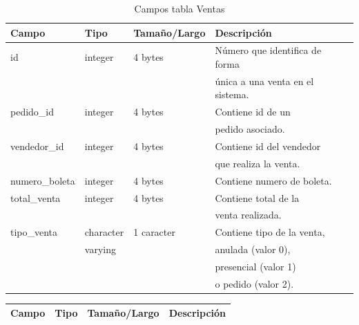 \documentclass[letterpaper,12pt]{article}
\begin{document}
\begin{enumerate}
\begin{table}[!ht]
\caption{Campos tabla Ventas}
\begin{center}
\begin{tabular}{|l|l|l|l|}
\hline
\textbf{Campo} \hspace*{2cm} & \textbf{Tipo} & \textbf{Tamaño/Largo} & \textbf{Descripción} \hspace*{3,5cm} \\
\hline
id & integer & 4 bytes&Número que identifica de forma\\ 
\mbox{} & \mbox{} & &única a una venta en el sistema.\\
\hline

pedido\_id & integer & 4 bytes&Contiene id de un\\
\mbox{} & \mbox{} & &pedido asociado.\\
\hline

vendedor\_id & integer & 4 bytes&Contiene id del vendedor\\
\mbox{} & \mbox{} & &que realiza la venta.\\
\hline

numero\_boleta & integer & 4 bytes&Contiene numero de boleta.\\
\hline

total\_venta & integer & 4 bytes&Contiene total de la\\
\mbox{} & \mbox{} & &venta realizada.\\
\hline

tipo\_venta & character &1 caracter &Contiene tipo de la venta, \\
\mbox{} & varying & &anulada (valor 0),\\
\mbox{} & \mbox{} & &presencial (valor 1)\\
\mbox{} & \mbox{} & &o pedido (valor 2).\\

\hline

\end{tabular}
\end{center}
\end{table}

\newpage

\vspace*{-1cm}
\begin{center}
\begin{table}
\begin{tabular}{|l|l|l|l|}
\hline
\textbf{Campo} \hspace*{2cm} & \textbf{Tipo} & \textbf{Tamaño/Largo} & \textbf{Descripción} \hspace*{3,5cm} \\
\hline


\end{tabular}
\end{table}
\end{center}
\end{enumerate}
\end{document}
